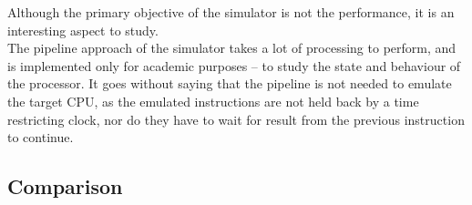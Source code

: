 Although the primary objective of the simulator is not the performance, it is
an interesting aspect to study.\\
The pipeline approach of the simulator takes a lot of processing to perform,
and is implemented only for academic purposes -- to study the state and behaviour
of the processor. It goes without saying that the pipeline is not needed to
emulate the target CPU, as the emulated instructions are not held back by a time
restricting clock, nor do they have to wait for result from the previous instruction to
continue.\\

\subsection{Comparison}

